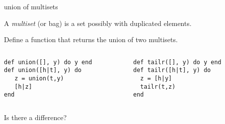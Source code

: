 \begin{frame}[fragile]{union of multisets}

A {\em multiset} (or bag) is a set possibly with duplicated elements.

\pause \vspace{20pt} Define a function that returns the union of two multisets.
\pause

\begin{columns}
  \begin{column}{0.5\textwidth}
\begin{verbatim}
def union([], y) do y end
def union([h|t], y) do
   z = union(t,y)
   [h|z]
end
\end{verbatim}
  \end{column}
\pause
  \begin{column}{0.5\textwidth}
\begin{verbatim}
def tailr([], y) do y end
def tailr([h|t], y) do 
  z = [h|y]
  tailr(t,z)
end
\end{verbatim}
  \end{column}
\end{columns}

\pause\vspace{20pt} Is there a difference?

\end{frame}

